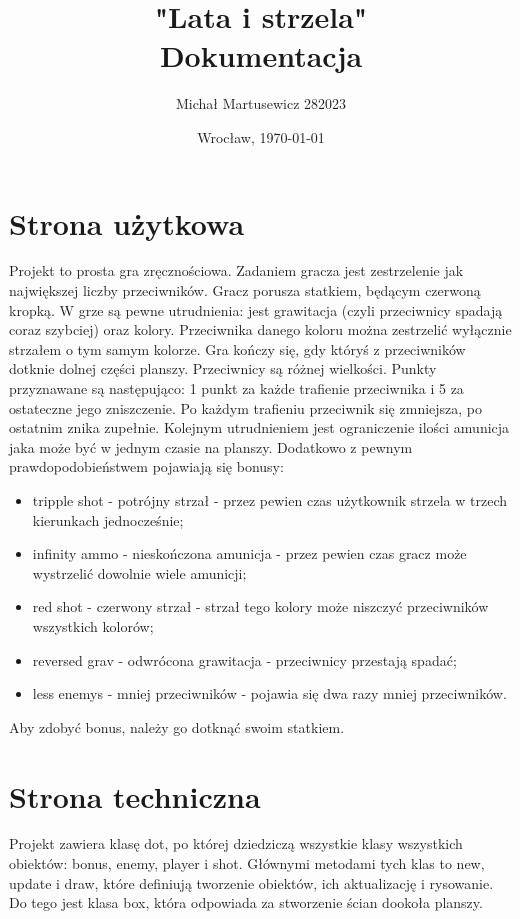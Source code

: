 \documentclass{article}
\author{Michał Martusewicz 282023}
\date{Wrocław, \today}
\title{\textbf{"Lata i strzela"}  \\ Dokumentacja}
\begin{document}
    \maketitle
    \section{Strona użytkowa}
    Projekt to prosta gra zręcznościowa. Zadaniem gracza jest zestrzelenie jak największej liczby przeciwników. Gracz porusza statkiem, będącym czerwoną kropką. W grze są pewne utrudnienia: jest grawitacja (czyli przeciwnicy spadają coraz szybciej) oraz kolory. Przeciwnika danego koloru można zestrzelić wyłącznie strzałem o tym samym kolorze. Gra kończy się, gdy któryś z przeciwników dotknie dolnej części planszy. Przeciwnicy są różnej wielkości. Punkty przyznawane są następująco: 1 punkt za każde trafienie przeciwnika i 5 za ostateczne jego zniszczenie. Po każdym trafieniu przeciwnik się zmniejsza, po ostatnim znika zupełnie.
    Kolejnym utrudnieniem jest ograniczenie ilości amunicja jaka może być w jednym czasie na planszy.
    Dodatkowo z pewnym prawdopodobieństwem pojawiają się bonusy:
    \begin{itemize}
    \item tripple shot - potrójny strzał - przez pewien czas użytkownik strzela w trzech kierunkach jednocześnie;
    \item infinity ammo - nieskończona amunicja - przez pewien czas gracz może wystrzelić dowolnie wiele amunicji;
    \item red shot - czerwony strzał - strzał tego kolory może niszczyć przeciwników wszystkich kolorów;
    \item reversed grav - odwrócona grawitacja - przeciwnicy przestają spadać;
    \item less enemys - mniej przeciwników - pojawia się dwa razy mniej przeciwników.
    \end{itemize}
    Aby zdobyć bonus, należy go dotknąć swoim statkiem.
    \section{Strona techniczna}
    Projekt zawiera klasę dot, po której dziedziczą wszystkie klasy wszystkich obiektów: bonus, enemy, player i shot. Głównymi metodami tych klas to new, update i draw, które definiują tworzenie obiektów, ich aktualizację i rysowanie. Do tego jest klasa box, która odpowiada za stworzenie ścian dookoła planszy.
\end{document}
